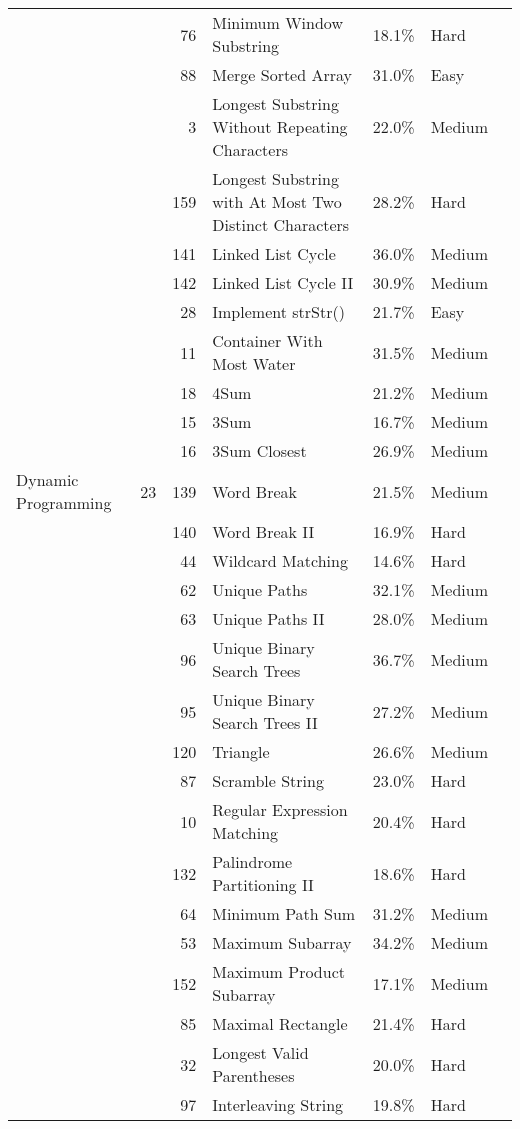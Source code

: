 \documentclass[9pt,b5paper]{article}
\begin{document}
\begin{center}
\begin{tabular}{lrrllll}
 &  & 76 & Minimum Window Substring & 18.1\% & Hard & \\
 &  & 88 & Merge Sorted Array & 31.0\% & Easy & \\
 &  & 3 & Longest Substring Without Repeating Characters & 22.0\% & Medium & \\
 &  & 159 & Longest Substring with At Most Two Distinct Characters & 28.2\% & Hard & \\
 &  & 141 & Linked List Cycle & 36.0\% & Medium & \\
 &  & 142 & Linked List Cycle II & 30.9\% & Medium & \\
 &  & 28 & Implement strStr() & 21.7\% & Easy & \\
 &  & 11 & Container With Most Water & 31.5\% & Medium & \\
 &  & 18 & 4Sum & 21.2\% & Medium & \\
 &  & 15 & 3Sum & 16.7\% & Medium & \\
 &  & 16 & 3Sum Closest & 26.9\% & Medium & \\
\hline
Dynamic Programming & 23 & 139 & Word Break & 21.5\% & Medium & \\
 &  & 140 & Word Break II & 16.9\% & Hard & \\
 &  & 44 & Wildcard Matching & 14.6\% & Hard & \\
 &  & 62 & Unique Paths & 32.1\% & Medium & \\
 &  & 63 & Unique Paths II & 28.0\% & Medium & \\
 &  & 96 & Unique Binary Search Trees & 36.7\% & Medium & \\
 &  & 95 & Unique Binary Search Trees II & 27.2\% & Medium & \\
 &  & 120 & Triangle & 26.6\% & Medium & \\
 &  & 87 & Scramble String & 23.0\% & Hard & \\
 &  & 10 & Regular Expression Matching & 20.4\% & Hard & \\
 &  & 132 & Palindrome Partitioning II & 18.6\% & Hard & \\
 &  & 64 & Minimum Path Sum & 31.2\% & Medium & \\
 &  & 53 & Maximum Subarray & 34.2\% & Medium & \\
 &  & 152 & Maximum Product Subarray & 17.1\% & Medium & \\
 &  & 85 & Maximal Rectangle & 21.4\% & Hard & \\
 &  & 32 & Longest Valid Parentheses & 20.0\% & Hard & \\
 &  & 97 & Interleaving String & 19.8\% & Hard & \\

\end{tabular}
\end{center}
\end{document}
